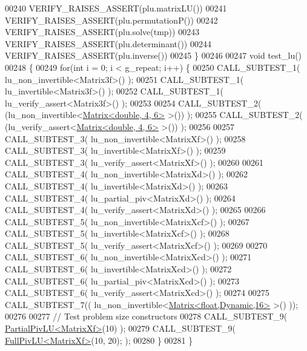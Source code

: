 \begin{DoxyCode}
00240   VERIFY\_RAISES\_ASSERT(plu.matrixLU())
00241   VERIFY\_RAISES\_ASSERT(plu.permutationP())
00242   VERIFY\_RAISES\_ASSERT(plu.solve(tmp))
00243   VERIFY\_RAISES\_ASSERT(plu.determinant())
00244   VERIFY\_RAISES\_ASSERT(plu.inverse())
00245 \}
00246 
00247 \textcolor{keywordtype}{void} test\_lu()
00248 \{
00249   \textcolor{keywordflow}{for}(\textcolor{keywordtype}{int} i = 0; i < g\_repeat; i++) \{
00250     CALL\_SUBTEST\_1( lu\_non\_invertible<Matrix3f>() );
00251     CALL\_SUBTEST\_1( lu\_invertible<Matrix3f>() );
00252     CALL\_SUBTEST\_1( lu\_verify\_assert<Matrix3f>() );
00253 
00254     CALL\_SUBTEST\_2( (lu\_non\_invertible<\hyperlink{group___core___module_class_eigen_1_1_matrix}{Matrix<double, 4, 6>} >()) );
00255     CALL\_SUBTEST\_2( (lu\_verify\_assert<\hyperlink{group___core___module_class_eigen_1_1_matrix}{Matrix<double, 4, 6>} >()) );
00256 
00257     CALL\_SUBTEST\_3( lu\_non\_invertible<MatrixXf>() );
00258     CALL\_SUBTEST\_3( lu\_invertible<MatrixXf>() );
00259     CALL\_SUBTEST\_3( lu\_verify\_assert<MatrixXf>() );
00260 
00261     CALL\_SUBTEST\_4( lu\_non\_invertible<MatrixXd>() );
00262     CALL\_SUBTEST\_4( lu\_invertible<MatrixXd>() );
00263     CALL\_SUBTEST\_4( lu\_partial\_piv<MatrixXd>() );
00264     CALL\_SUBTEST\_4( lu\_verify\_assert<MatrixXd>() );
00265 
00266     CALL\_SUBTEST\_5( lu\_non\_invertible<MatrixXcf>() );
00267     CALL\_SUBTEST\_5( lu\_invertible<MatrixXcf>() );
00268     CALL\_SUBTEST\_5( lu\_verify\_assert<MatrixXcf>() );
00269 
00270     CALL\_SUBTEST\_6( lu\_non\_invertible<MatrixXcd>() );
00271     CALL\_SUBTEST\_6( lu\_invertible<MatrixXcd>() );
00272     CALL\_SUBTEST\_6( lu\_partial\_piv<MatrixXcd>() );
00273     CALL\_SUBTEST\_6( lu\_verify\_assert<MatrixXcd>() );
00274 
00275     CALL\_SUBTEST\_7(( lu\_non\_invertible<\hyperlink{group___core___module_class_eigen_1_1_matrix}{Matrix<float,Dynamic,16>} >() ));
00276 
00277     \textcolor{comment}{// Test problem size constructors}
00278     CALL\_SUBTEST\_9( \hyperlink{group___l_u___module_class_eigen_1_1_partial_piv_l_u}{PartialPivLU<MatrixXf>}(10) );
00279     CALL\_SUBTEST\_9( \hyperlink{group___l_u___module_class_eigen_1_1_full_piv_l_u}{FullPivLU<MatrixXf>}(10, 20); );
00280   \}
00281 \}
\end{DoxyCode}
